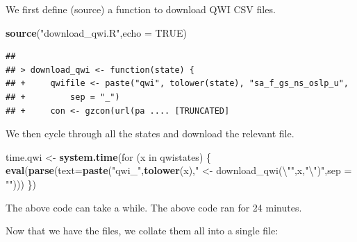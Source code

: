 \documentclass[]{article}
\newenvironment{Shaded}{\begin{snugshade}}{\end{snugshade}}
\newcommand{\KeywordTok}[1]{\textcolor[rgb]{0.13,0.29,0.53}{\textbf{{#1}}}}
\newcommand{\DataTypeTok}[1]{\textcolor[rgb]{0.13,0.29,0.53}{{#1}}}
\newcommand{\DecValTok}[1]{\textcolor[rgb]{0.00,0.00,0.81}{{#1}}}
\newcommand{\CharTok}[1]{\textcolor[rgb]{0.31,0.60,0.02}{{#1}}}
\newcommand{\StringTok}[1]{\textcolor[rgb]{0.31,0.60,0.02}{{#1}}}
\newcommand{\OtherTok}[1]{\textcolor[rgb]{0.56,0.35,0.01}{{#1}}}
\newcommand{\NormalTok}[1]{{#1}}
\begin{document}
We first define (source) a function to download QWI CSV files.

\begin{Shaded}
\begin{Highlighting}[]
\KeywordTok{source}\NormalTok{(}\StringTok{"download_qwi.R"}\NormalTok{,}\DataTypeTok{echo =} \OtherTok{TRUE}\NormalTok{)}
\end{Highlighting}
\end{Shaded}

\begin{verbatim}
## 
## > download_qwi <- function(state) {
## +     qwifile <- paste("qwi", tolower(state), "sa_f_gs_ns_oslp_u", 
## +         sep = "_")
## +     con <- gzcon(url(pa .... [TRUNCATED]
\end{verbatim}

We then cycle through all the states and download the relevant file.

\begin{Shaded}
\begin{Highlighting}[]
\NormalTok{time.qwi <-}\StringTok{ }\KeywordTok{system.time}\NormalTok{(for (x in qwistates) \{ }
  \KeywordTok{eval}\NormalTok{(}\KeywordTok{parse}\NormalTok{(}\DataTypeTok{text=}\KeywordTok{paste}\NormalTok{(}\StringTok{"qwi_"}\NormalTok{,}\KeywordTok{tolower}\NormalTok{(x),}\StringTok{" <- download_qwi(}\CharTok{\textbackslash{}"}\StringTok{"}\NormalTok{,x,}\StringTok{"}\CharTok{\textbackslash{}"}\StringTok{)"}\NormalTok{,}\DataTypeTok{sep =} \StringTok{""}\NormalTok{)))}
  \NormalTok{\})}
\end{Highlighting}
\end{Shaded}

The above code can take a while. The above code ran for 24 minutes.

Now that we have the files, we collate them all into a single file:

\begin{Shaded}
\end{Shaded}
\end{document}
